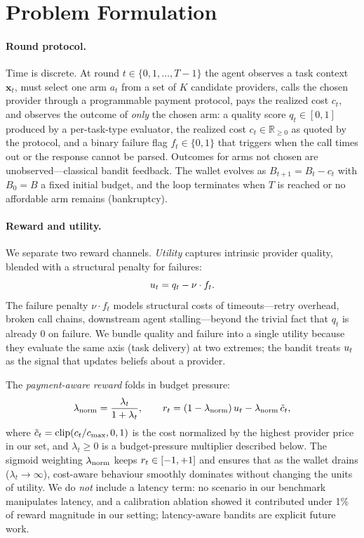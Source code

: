 \section{Problem Formulation}
\label{sec:problem}

\paragraph{Round protocol.}
Time is discrete. At round $t \in \{0, 1, \ldots, T-1\}$ the agent observes a task context $\mathbf{x}_t$, must select one arm $a_t$ from a set of $K$ candidate providers, calls the chosen provider through a programmable payment protocol, pays the realized cost $c_t$, and observes the outcome of \emph{only} the chosen arm: a quality score $q_t \in [0, 1]$ produced by a per-task-type evaluator, the realized cost $c_t \in \mathbb{R}_{\geq 0}$ as quoted by the protocol, and a binary failure flag $f_t \in \{0, 1\}$ that triggers when the call times out or the response cannot be parsed. Outcomes for arms not chosen are unobserved---classical bandit feedback. The wallet evolves as $B_{t+1} = B_t - c_t$ with $B_0 = B$ a fixed initial budget, and the loop terminates when $T$ is reached or no affordable arm remains (bankruptcy).

\paragraph{Reward and utility.}
We separate two reward channels. \emph{Utility} captures intrinsic provider quality, blended with a structural penalty for failures:
\begin{equation}
\label{eq:utility}
u_t = q_t - \nu \cdot f_t.
\end{equation}
The failure penalty $\nu \cdot f_t$ models structural costs of timeouts---retry overhead, broken call chains, downstream agent stalling---beyond the trivial fact that $q_t$ is already $0$ on failure. We bundle quality and failure into a single utility because they evaluate the same axis (task delivery) at two extremes; the bandit treats $u_t$ as the signal that updates beliefs about a provider.

The \emph{payment-aware reward} folds in budget pressure:
\begin{equation}
\label{eq:reward}
\lambda_{\mathrm{norm}} = \frac{\lambda_t}{1 + \lambda_t}, \qquad
r_t = (1 - \lambda_{\mathrm{norm}})\,u_t - \lambda_{\mathrm{norm}}\,\tilde c_t,
\end{equation}
where $\tilde c_t = \mathrm{clip}(c_t / c_{\max}, 0, 1)$ is the cost normalized by the highest provider price in our set, and $\lambda_t \geq 0$ is a budget-pressure multiplier described below. The sigmoid weighting $\lambda_{\mathrm{norm}}$ keeps $r_t \in [-1, +1]$ and ensures that as the wallet drains ($\lambda_t \to \infty$), cost-aware behaviour smoothly dominates without changing the units of utility. We do \emph{not} include a latency term: no scenario in our benchmark manipulates latency, and a calibration ablation showed it contributed under 1\% of reward magnitude in our setting; latency-aware bandits are explicit future work.

